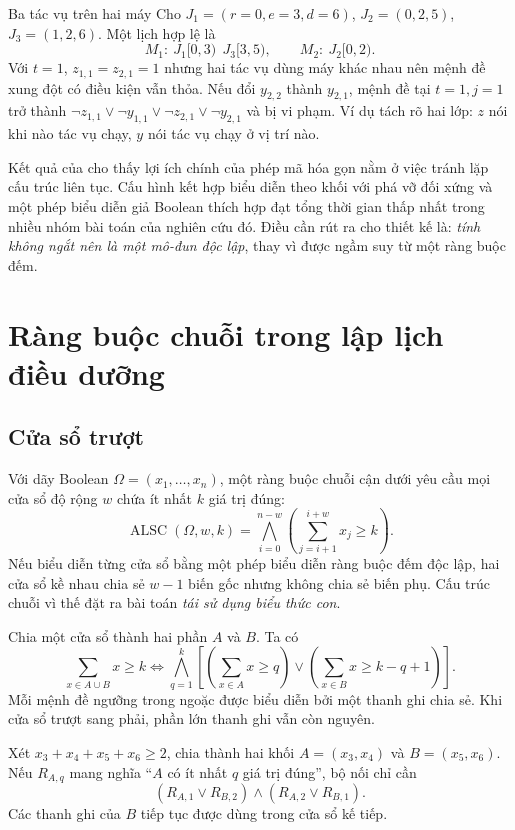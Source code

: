 \begin{workedexample}{Ba tác vụ trên hai máy}
Cho \(J_1=(r=0,e=3,d=6)\), \(J_2=(0,2,5)\), \(J_3=(1,2,6)\).
Một lịch hợp lệ là
\[
  M_1:\ J_1[0,3)\ \ J_3[3,5),
  \qquad
  M_2:\ J_2[0,2).
\]
Với \(t=1\), \(z_{1,1}=z_{2,1}=1\) nhưng hai tác vụ dùng máy khác nhau nên
mệnh đề xung đột có điều kiện vẫn thỏa. Nếu đổi \(y_{2,2}\) thành \(y_{2,1}\),
mệnh đề tại \(t=1,j=1\) trở thành
\(
\neg z_{1,1}\lor\neg y_{1,1}\lor
\neg z_{2,1}\lor\neg y_{2,1}
\)
và bị vi phạm. Ví dụ tách rõ hai lớp: \(z\) nói khi nào tác vụ chạy, \(y\)
nói tác vụ chạy ở vị trí nào.
\end{workedexample}

Kết quả của \textcite{kieu2025scheduling} cho thấy lợi ích chính của phép mã
hóa gọn nằm ở việc tránh lặp cấu trúc liên tục. Cấu hình kết hợp biểu diễn theo
khối với phá vỡ đối xứng và một phép biểu diễn giả Boolean thích hợp đạt tổng thời
gian thấp nhất trong nhiều nhóm bài toán của nghiên cứu đó. Điều cần rút ra cho
thiết kế là: \emph{tính không ngắt nên là một mô-đun độc lập}, thay vì được
ngầm suy từ một ràng buộc đếm.

\section{Ràng buộc chuỗi trong lập lịch điều dưỡng}

\subsection{Cửa sổ trượt}

Với dãy Boolean \(\Omega=(x_1,\ldots,x_n)\), một ràng buộc chuỗi cận dưới yêu
cầu mọi cửa sổ độ rộng \(w\) chứa ít nhất \(k\) giá trị đúng:
\[
  \operatorname{ALSC}(\Omega,w,k)=
  \bigwedge_{i=0}^{n-w}
  \left(\sum_{j=i+1}^{i+w}x_j\ge k\right).
\]
Nếu biểu diễn từng cửa sổ bằng một phép biểu diễn ràng buộc đếm độc lập, hai cửa sổ
kề nhau chia sẻ \(w-1\) biến gốc nhưng không chia sẻ biến phụ. Cấu trúc chuỗi
vì thế đặt ra bài toán \emph{tái sử dụng biểu thức con}.

Chia một cửa sổ thành hai phần \(A\) và \(B\). Ta có
\[
  \sum_{x\in A\cup B}x\ge k
  \iff
  \bigwedge_{q=1}^{k}
  \left[
    \left(\sum_{x\in A}x\ge q\right)
    \lor
    \left(\sum_{x\in B}x\ge k-q+1\right)
  \right].
\]
Mỗi mệnh đề ngưỡng trong ngoặc được biểu diễn bởi một thanh ghi chia sẻ.
Khi cửa sổ trượt sang phải, phần lớn thanh ghi vẫn còn nguyên.

\begin{example}
Xét \(x_3+x_4+x_5+x_6\ge2\), chia thành hai khối
\(A=(x_3,x_4)\) và \(B=(x_5,x_6)\). Nếu
\(R_{A,q}\) mang nghĩa ``\(A\) có ít nhất \(q\) giá trị đúng'', bộ nối chỉ
cần
\[
  (R_{A,1}\lor R_{B,2})
  \land
  (R_{A,2}\lor R_{B,1}).
\]
Các thanh ghi của \(B\) tiếp tục được dùng trong cửa sổ kế tiếp.
\end{example}

